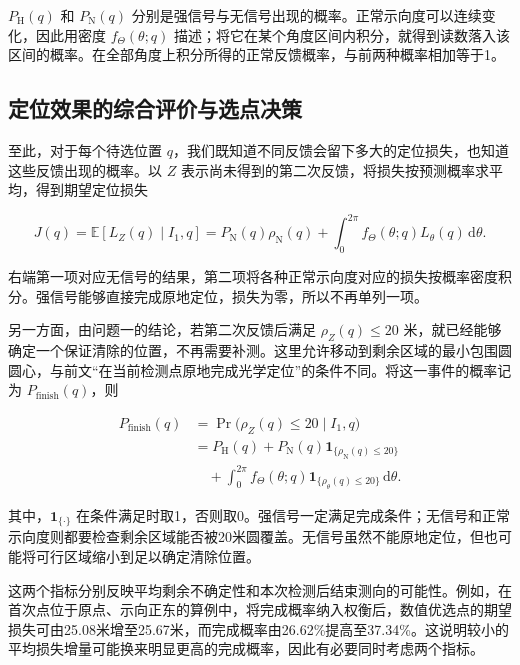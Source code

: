 \documentclass[UTF8,a4paper,zihao=-4,fontset=none]{ctexart}
\begin{document}
\(P_{\mathrm H}(q)\) 和 \(P_{\mathrm N}(q)\) 分别是强信号与无信号出现的概率。正常示向度可以连续变化，因此用密度 \(f_\Theta(\theta;q)\) 描述；将它在某个角度区间内积分，就得到读数落入该区间的概率。在全部角度上积分所得的正常反馈概率，与前两种概率相加等于1。

\subsection{定位效果的综合评价与选点决策}

至此，对于每个待选位置 \(q\)，我们既知道不同反馈会留下多大的定位损失，也知道这些反馈出现的概率。以 \(Z\) 表示尚未得到的第二次反馈，将损失按预测概率求平均，得到期望定位损失

\begin{equation}
 J(q)=\mathbb E[L_Z(q)\mid I_1,q]
 =P_{\mathrm N}(q)\rho_{\mathrm N}(q)
 +\int_0^{2\pi}f_\Theta(\theta;q)L_\theta(q)\,\mathrm d\theta.
\label{eq:q2-pair-expected-objective}
\end{equation}

右端第一项对应无信号的结果，第二项将各种正常示向度对应的损失按概率密度积分。强信号能够直接完成原地定位，损失为零，所以不再单列一项。

另一方面，由问题一的结论，若第二次反馈后满足 \(\rho_Z(q)\le20\) 米，就已经能够确定一个保证清除的位置，不再需要补测。这里允许移动到剩余区域的最小包围圆圆心，与前文“在当前检测点原地完成光学定位”的条件不同。将这一事件的概率记为 \(P_{\mathrm{finish}}(q)\)，则

\begin{equation}
\begin{aligned}
 P_{\mathrm{finish}}(q)
 &=\Pr\bigl(\rho_Z(q)\le20\mid I_1,q\bigr)\\
 &=P_{\mathrm H}(q)+P_{\mathrm N}(q)\mathbf1_{\{\rho_{\mathrm N}(q)\le20\}}\\
 &\quad+\int_0^{2\pi}f_\Theta(\theta;q)\mathbf1_{\{\rho_\theta(q)\le20\}}\,\mathrm d\theta.
\end{aligned}
\label{eq:q2-completion-probability}
\end{equation}

其中，\(\mathbf1_{\{\cdot\}}\) 在条件满足时取1，否则取0。强信号一定满足完成条件；无信号和正常示向度则都要检查剩余区域能否被20米圆覆盖。无信号虽然不能原地定位，但也可能将可行区域缩小到足以确定清除位置。

这两个指标分别反映平均剩余不确定性和本次检测后结束测向的可能性。例如，在首次点位于原点、示向正东的算例中，将完成概率纳入权衡后，数值优选点的期望损失可由25.08米增至25.67米，而完成概率由26.62\%提高至37.34\%。这说明较小的平均损失增量可能换来明显更高的完成概率，因此有必要同时考虑两个指标。
\end{document}
